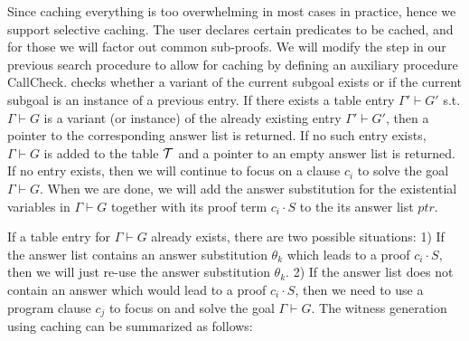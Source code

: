 \documentclass{llncs}
\newcommand{\vd}{\vdash}
\begin{document}
Since caching everything is too overwhelming in most cases in
practice, hence we support selective caching. The user declares
certain  predicates to be cached, and for those we will factor out
common sub-proofs. We will modify the {} step in our
previous search procedure to allow for caching by defining an
auxiliary procedure {\sf CallCheck}. {\sf{CallCheck($\Gamma \vd G, \cal{T}$)}} checks whether a variant of
the current subgoal exists or if the current subgoal is an instance of
a previous entry. If there exists a table entry $\Gamma' \vd G'$
s.t. $\Gamma \vd G$ is a variant (or instance) of the already existing
entry $\Gamma' \vd G'$, then a pointer to the corresponding answer
list is returned. If no such entry exists, $\Gamma \vd G$ is added to
the table $\cal{T}$ and a pointer to an empty answer list is
returned. If no entry exists, then we will continue to focus on a
clause $c_i$ to solve the goal $\Gamma \vd G$. When we are done, we
will add the answer substitution for the existential variables in
$\Gamma \vd G$ together with its proof term $c_i \cdot S$ to the its
answer list $ptr$. 

If a table entry for $\Gamma \vd G$ already exists, there are two
possible situations: 1) If the answer list contains an answer
substitution $\theta_k$  which leads to a proof $c_i \cdot S$,
then we will just re-use the answer substitution $\theta_k$. 2) If the
answer list does not contain an answer which would lead to a proof
$c_i \cdot S$, then we need to use a program clause $c_j$ to focus on
and solve the goal $\Gamma \vd G$. The witness generation using
caching can be summarized as follows:
\end{document}
